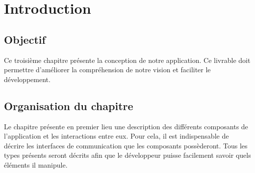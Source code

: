 \chapter{Introduction}

			\section{Objectif}
Ce troisième chapitre présente la conception de notre application. Ce livrable doit permettre d'améliorer la compréhension de notre vision et faciliter le développement. 

			\section{Organisation du chapitre}
Le chapitre présente en premier lieu une description des différents composants de l'application et les interactions entre eux. Pour cela, il est indispensable de décrire les interfaces de communication que les composants possèderont. Tous les types présents seront décrits afin que le développeur puisse facilement savoir quels éléments il manipule. 

